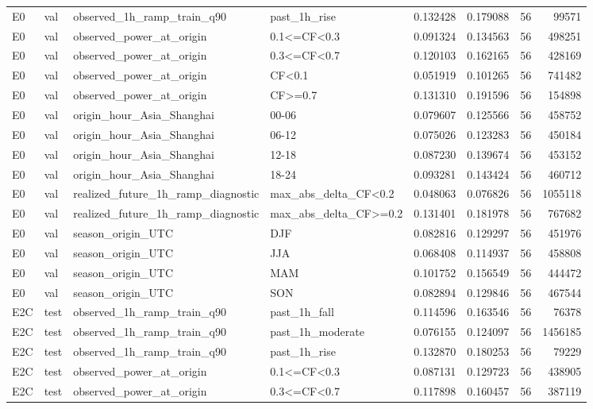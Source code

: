 \begin{tabular}{llllrrrr}
E0 & val & observed\_1h\_ramp\_train\_q90 & past\_1h\_rise & 0.132428 & 0.179088 & 56 & 99571 \\
E0 & val & observed\_power\_at\_origin & 0.1<=CF<0.3 & 0.091324 & 0.134563 & 56 & 498251 \\
E0 & val & observed\_power\_at\_origin & 0.3<=CF<0.7 & 0.120103 & 0.162165 & 56 & 428169 \\
E0 & val & observed\_power\_at\_origin & CF<0.1 & 0.051919 & 0.101265 & 56 & 741482 \\
E0 & val & observed\_power\_at\_origin & CF>=0.7 & 0.131310 & 0.191596 & 56 & 154898 \\
E0 & val & origin\_hour\_Asia\_Shanghai & 00-06 & 0.079607 & 0.125566 & 56 & 458752 \\
E0 & val & origin\_hour\_Asia\_Shanghai & 06-12 & 0.075026 & 0.123283 & 56 & 450184 \\
E0 & val & origin\_hour\_Asia\_Shanghai & 12-18 & 0.087230 & 0.139674 & 56 & 453152 \\
E0 & val & origin\_hour\_Asia\_Shanghai & 18-24 & 0.093281 & 0.143424 & 56 & 460712 \\
E0 & val & realized\_future\_1h\_ramp\_diagnostic & max\_abs\_delta\_CF<0.2 & 0.048063 & 0.076826 & 56 & 1055118 \\
E0 & val & realized\_future\_1h\_ramp\_diagnostic & max\_abs\_delta\_CF>=0.2 & 0.131401 & 0.181978 & 56 & 767682 \\
E0 & val & season\_origin\_UTC & DJF & 0.082816 & 0.129297 & 56 & 451976 \\
E0 & val & season\_origin\_UTC & JJA & 0.068408 & 0.114937 & 56 & 458808 \\
E0 & val & season\_origin\_UTC & MAM & 0.101752 & 0.156549 & 56 & 444472 \\
E0 & val & season\_origin\_UTC & SON & 0.082894 & 0.129846 & 56 & 467544 \\
E2C & test & observed\_1h\_ramp\_train\_q90 & past\_1h\_fall & 0.114596 & 0.163546 & 56 & 76378 \\
E2C & test & observed\_1h\_ramp\_train\_q90 & past\_1h\_moderate & 0.076155 & 0.124097 & 56 & 1456185 \\
E2C & test & observed\_1h\_ramp\_train\_q90 & past\_1h\_rise & 0.132870 & 0.180253 & 56 & 79229 \\
E2C & test & observed\_power\_at\_origin & 0.1<=CF<0.3 & 0.087131 & 0.129723 & 56 & 438905 \\
E2C & test & observed\_power\_at\_origin & 0.3<=CF<0.7 & 0.117898 & 0.160457 & 56 & 387119 \\

\end{tabular}
